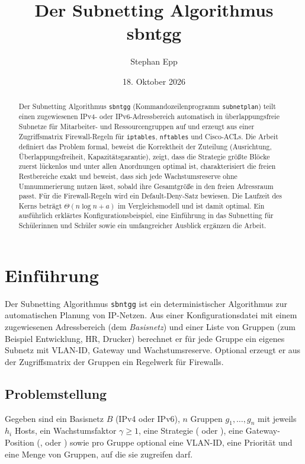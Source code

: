 \documentclass[a4paper,12pt]{article}
\title{Der Subnetting Algorithmus sbntgg}
\author{Stephan Epp}
\date{18. Oktober 2026}
\theoremstyle{definition}
\newcommand{\code}[1]{\texttt{\detokenize{#1}}}
\begin{document}
\maketitle

\begin{abstract}
\noindent
Der Subnetting Algorithmus \texttt{sbntgg} (Kommandozeilenprogramm \texttt{subnetplan}) teilt einen zugewiesenen IPv4- oder IPv6-Adressbereich automatisch in überlappungsfreie Subnetze für Mitarbeiter- und Ressourcengruppen auf und erzeugt aus einer Zugriffsmatrix Firewall-Regeln für \texttt{iptables}, \texttt{nftables} und Cisco-ACLs.
Die Arbeit definiert das Problem formal, beweist die Korrektheit der Zuteilung (Ausrichtung, Überlappungsfreiheit, Kapazitätsgarantie), zeigt, dass die Strategie \glqq größte Blöcke zuerst\grqq{} lückenlos und unter allen Anordnungen optimal ist, charakterisiert die freien Restbereiche exakt und beweist, dass sich jede Wachstumsreserve ohne Umnummerierung nutzen lässt, sobald ihre Gesamtgröße in den freien Adressraum passt.
Für die Firewall-Regeln wird ein Default-Deny-Satz bewiesen.
Die Laufzeit des Kerns beträgt $\Theta(n\log n + a)$ im Vergleichsmodell und ist damit optimal.
Ein ausführlich erklärtes Konfigurationsbeispiel, eine Einführung in das Subnetting für Schülerinnen und Schüler sowie ein umfangreicher Ausblick ergänzen die Arbeit.
\end{abstract}

\tableofcontents
\newpage

\section{Einführung}

Der Subnetting Algorithmus \texttt{sbntgg} ist ein deterministischer Algorithmus zur automatischen Planung von IP-Netzen. Aus einer Konfigurationsdatei mit einem zugewiesenen Adressbereich (dem \emph{Basisnetz}) und einer Liste von Gruppen (zum Beispiel \glqq Entwicklung\grqq, \glqq HR\grqq, \glqq Drucker\grqq) berechnet er für jede Gruppe ein eigenes Subnetz mit VLAN-ID, Gateway und Wachstumsreserve. Optional erzeugt er aus der Zugriffsmatrix der Gruppen ein Regelwerk für Firewalls.

\subsection{Problemstellung}

Gegeben sind ein Basisnetz $B$ (IPv4 oder IPv6), $n$ Gruppen $g_1,\ldots,g_n$ mit jeweils $h_i$ Hosts, ein Wachstumsfaktor $\gamma \ge 1$, eine Strategie (\code{vlsm} oder \code{fixed}), eine Gateway-Position (\code{first}, \code{last} oder \code{none}) sowie pro Gruppe optional eine VLAN-ID, eine Priorität und eine Menge von Gruppen, auf die sie zugreifen darf.
\end{document}
